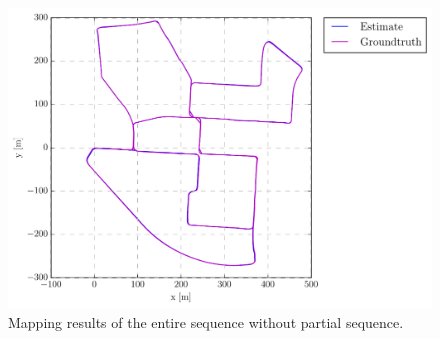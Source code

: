 \begin{figure}[H]
	\centering
	\includegraphics[width=5in]{Chapter4/KITTI/00/gps/plots/trajectory_side_sim3_-1.pdf}
	\caption{Mapping results of the entire sequence without partial sequence.}
	\label{fig:kitticlientmapping} 
\end{figure}

